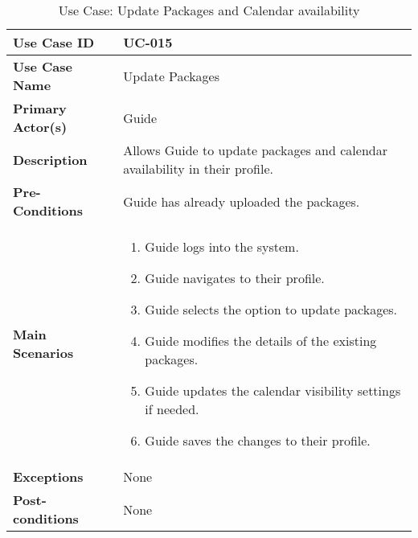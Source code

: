 \begin{table}[ht]
    \centering
    \begin{tabular}{|l|p{}|}
        \hline
        \textbf{Use Case ID} & UC-015 \\
        \hline
        \textbf{Use Case Name} & Update Packages \\
        \hline
        \textbf{Primary Actor(s)} & Guide \\
        \hline
        \textbf{Description} & Allows Guide to update packages and calendar availability in their profile. \\
        \hline
        \textbf{Pre-Conditions} & Guide has already uploaded the packages. \\
        \hline
        \textbf{Main Scenarios} & 
        \begin{enumerate}[label=\arabic*.,itemsep=0pt]
            \item Guide logs into the system.
            \item Guide navigates to their profile.
            \item Guide selects the option to update packages.
            \item Guide modifies the details of the existing packages.
            \item Guide updates the calendar visibility settings if needed.
            \item Guide saves the changes to their profile.
        \end{enumerate} \\
        \hline
        \textbf{Exceptions} & None \\
        \hline
        \textbf{Post-conditions} & None \\
        \hline
    \end{tabular}
    \label{tab:use-case-update-packages}
    \caption{Use Case: Update Packages and Calendar availability}
\end{table}


